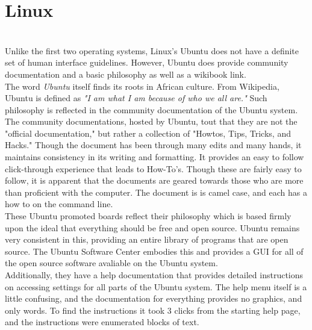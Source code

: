 \documentclass[12pt, oneside, letterpaper]{report}
\begin{document}
\section*{Linux} ~\\
Unlike the first two operating systems, Linux's Ubuntu does not have a definite set of human interface guidelines. However, Ubuntu does provide community documentation and a basic philosophy as well as a wikibook link. \\
The word \textit{Ubuntu} itself finds its roots in African culture.  From Wikipedia, Ubuntu is defined as \textit{"I am what I am because of who we all are."}  Such philosophy is reflected in the community documentation of the Ubuntu system.  The community documentations, hosted by Ubuntu, tout that they are not the "official documentation," but rather a collection of "Howtos, Tips, Tricks, and Hacks." Though the document has been through many edits and many hands, it maintains consistency in its writing and formatting.   
 It provides an easy to follow click-through experience that leads to How-To's. Though these are fairly easy to follow, it is apparent that the documents are geared towards those who are more than proficient with the computer.  The document is is camel case, and each has a how to on the command line.  \\
These Ubuntu promoted boards reflect their philosophy which is based firmly upon the ideal that everything should be free and open source.  Ubuntu remains very consistent in this, providing an entire library of programs that are open source.  The Ubuntu Software Center embodies this and provides a GUI for all of the open source software avaliable on the Ubuntu system.  \\
Additionally, they have a help documentation that provides detailed instructions on accessing settings for all parts of the Ubuntu system. The help menu itself is a little confusing, and the documentation for everything provides no graphics, and only words. To find the instructions it took 3 clicks from the starting help page, and the instructions were enumerated blocks of text. \\
\end{document}
